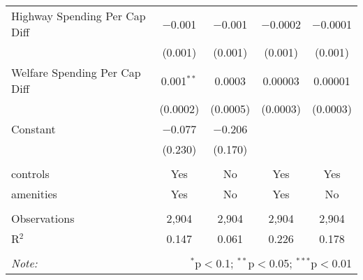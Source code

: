 \begin{table}[!htbp]
\begin{tabular}{@{\extracolsep{5pt}}lcccc}
  Highway Spending Per Cap Diff & $-$0.001 & $-$0.001 & $-$0.0002 & $-$0.0001 \\ 
  & (0.001) & (0.001) & (0.001) & (0.001) \\ 
  Welfare Spending Per Cap Diff & 0.001$^{**}$ & 0.0003 & 0.00003 & 0.00001 \\ 
  & (0.0002) & (0.0005) & (0.0003) & (0.0003) \\ 
  Constant & $-$0.077 & $-$0.206 &  &  \\ 
  & (0.230) & (0.170) &  &  \\ 
 \hline \\[-1.8ex] 
controls & Yes & No & Yes & Yes \\ 
amenities & Yes & No & Yes & No \\ 
\hline \\[-1.8ex] 
Observations & 2,904 & 2,904 & 2,904 & 2,904 \\ 
R$^{2}$ & 0.147 & 0.061 & 0.226 & 0.178 \\ 
\hline 
\hline \\[-1.8ex] 
\textit{Note:}  & \multicolumn{4}{r}{$^{*}$p$<$0.1; $^{**}$p$<$0.05; $^{***}$p$<$0.01} \\ 
\end{tabular} 
\end{table} 
